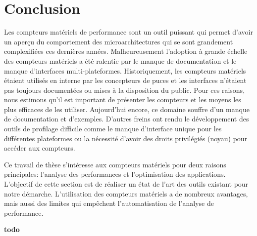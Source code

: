 

\section{Conclusion}

    Les compteurs matériels de performance sont un outil puissant qui permet d'avoir un aperçu du comportement des microarchitectures qui se sont grandement complexifiées ces dernières années. Malheureusement l'adoption à grande échelle des compteurs matériels a été ralentie par le manque de documentation et le manque d'interfaces multi-plateformes. Historiquement, les compteurs matériels étaient utilisés en interne par les concepteurs de puces et les interfaces n'étaient pas toujours documentées ou mises à la disposition du public. Pour ces raisons, nous estimons qu'il est important de présenter les compteurs et les moyens les plus efficaces de les utiliser. Aujourd'hui encore, ce domaine souffre d'un manque de documentation et d'exemples. D'autres freins ont rendu le développement des outils de profilage difficile comme le manque d'interface unique pour les différentes plateformes ou la nécessité d'avoir des droits privilégiés (noyau) pour accéder aux compteurs.
    
    Ce travail de thèse s'intéresse aux compteurs matériels pour deux raisons principales: l'analyse des performances et l'optimisation des applications. L'objectif de cette section est de réaliser un état de l'art des outils existant pour notre démarche. L'utilisation des compteurs matériels a de nombreux avantages, mais aussi des limites qui empêchent l'automatisation de l'analyse de performance. 
          
          
          
          
            
            \textbf{todo}
                       